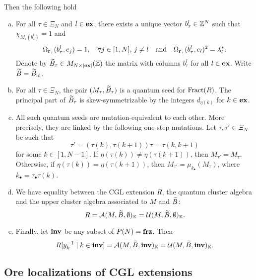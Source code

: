 \begin{theorem}
	Then the following hold
	\begin{enumerate}[(a)]
		\item For all $\tau \in \Xi_N$ and $l \in \mathbf{ex}$, there exists a unique vector $b^l_{\tau}\in
			      \mathbb{Z}^N$ such that $\chi_{M_\tau (b^l_\tau)} = 1$ and
		      \begin{equation*}
			      \Omega_{\mathbf{r}_\tau}(b^l_\tau, e_j) = 1, \quad \forall j\in [1, N],\,j\neq l \quad \text{and} \quad \Omega_{\mathbf{r}_\tau}(b^l_{\tau}, e_l)^2 = \lambda_l^*.
		      \end{equation*}
		      Denote by $\widetilde{B}_\tau \in M_{N \times |\mathbf{ex}|}(\mathbb{Z})$ the matrix with columns $b^l_\tau$
		      for all $l \in \mathbf{ex}$. Write $\widetilde{B} = \widetilde{B}_{\operatorname{id}}$.
		\item For all $\tau \in \Xi_N$, the pair $(M_\tau, \widetilde{B}_\tau)$ is a quantum seed for
		      $\operatorname{Fract}(R)$. The principal part of $\widetilde{B}_\tau$ is skew-symmetrizable by the integers
		      $d_{\eta(k)}$ for $k \in \mathbf{ex}$.
		\item All such quantum seeds are mutation-equivalent to each other. More precisely, they are
		      linked by the following one-step mutations. Let $\tau, \tau' \in \Xi_N$ be such that
		      \begin{equation*}
			      \tau' = (\tau(k), \tau(k+1))\tau = \tau (k, k+1)
		      \end{equation*}
		      for some $k\in [1, N-1]$. If $\eta(\tau(k)) \neq \eta(\tau(k+1))$, then $M_{\tau'} = M_\tau$. Otherwise, if $\eta(\tau(k)) = \eta(\tau(k+1))$, then $M_{\tau'} = \mu_{k_\bullet}(M_\tau)$, where $k_\bullet = \tau_\bullet \tau(k)$.
		\item We have equality between the CGL extension $R$, the quantum cluster algebra and the
		      upper cluster algebra associated to $M$ and $\widetilde{B}$:
		      \begin{equation*}
			      R = \mathcal{A}(M, \widetilde{B}, \emptyset)_{\mathbb{K}} = \mathcal{U}(M, \widetilde{B}, \emptyset)_{\mathbb{K}}.
		      \end{equation*}
		\item Finally, let $\mathbf{inv}$ be any subset of $P(N) = \mathbf{frz}$. Then
		      \begin{equation*}
			      R[y_k^{-1} \mid k \in \mathbf{inv}] = \mathcal{A}(M, \widetilde{B}, \mathbf{inv})_{\mathbb{K}} = \mathcal{U}(M, \widetilde{B}, \mathbf{inv})_{\mathbb{K}}.
		      \end{equation*}
	\end{enumerate}
\end{theorem}

\subsection{Ore localizations of CGL extensions}

